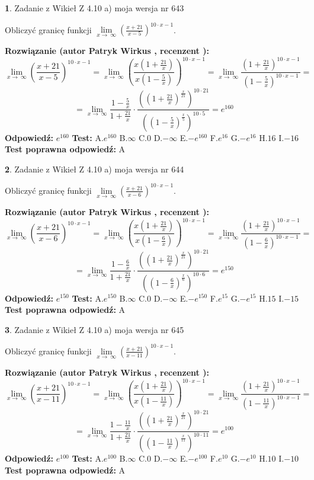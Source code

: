\documentclass[12pt, a4paper]{article}
\theoremstyle{definition} %
\newtheorem{zad}{}
\newcommand{\zadStart}[1]{\begin{zad}#1\newline}
\newcommand{\zadStop}{\end{zad}}
\newcommand{\rozwStart}[2]{\noindent \textbf{Rozwiązanie (autor #1 , recenzent #2): }\newline}
\newcommand{\rozwStop}{\newline}
\newcommand{\odpStart}{\noindent \textbf{Odpowiedź:}\newline}
\newcommand{\odpStop}{\newline}
\newcommand{\testStart}{\noindent \textbf{Test:}\newline}
\newcommand{\testStop}{\newline}
\newcommand{\kluczStart}{\noindent \textbf{Test poprawna odpowiedź:}\newline}
\newcommand{\kluczStop}{\newline}
\begin{document}
\zadStart{Zadanie z Wikieł Z 4.10 a) moja wersja nr 643}

Obliczyć granicę funkcji  $\lim\limits_{x\to\ \infty}(\frac{x+21}{x-5})^{10\cdot x-1}$.
\zadStop
\rozwStart{Patryk Wirkus}{}
$$\lim\limits_{x\to\ \infty}(\frac{x+21}{x-5})^{10\cdot x-1} = \lim\limits_{x\to\ \infty}(\frac{x(1+\frac{21}{x})}{x(1-\frac{5}{x})})^{10\cdot x-1}=\lim\limits_{x\to\ \infty}\frac{(1+\frac{21}{x})^{10\cdot x-1}}{(1-\frac{5}{x})^{10\cdot x-1}}=$$
$$=\lim\limits_{x\to\ \infty}\frac{1-\frac{5}{x}}{1+\frac{21}{x}}\cdot\frac{((1+\frac{21}{x})^{\frac{x}{21}})^{10\cdot21}}{((1-\frac{5}{x})^{\frac{x}{5}})^{10\cdot5}}=e^{160}$$
\rozwStop
\odpStart
$e^{160}$
\odpStop
\testStart
A.$e^{160}$ B.$\infty$ C.$0$ D.$-\infty$ E.$-e^{160}$
F.$e^{16}$ G.$-e^{16}$
H.$16$
I.$-16$
\testStop
\kluczStart
A
\kluczStop



\zadStart{Zadanie z Wikieł Z 4.10 a) moja wersja nr 644}

Obliczyć granicę funkcji  $\lim\limits_{x\to\ \infty}(\frac{x+21}{x-6})^{10\cdot x-1}$.
\zadStop
\rozwStart{Patryk Wirkus}{}
$$\lim\limits_{x\to\ \infty}(\frac{x+21}{x-6})^{10\cdot x-1} = \lim\limits_{x\to\ \infty}(\frac{x(1+\frac{21}{x})}{x(1-\frac{6}{x})})^{10\cdot x-1}=\lim\limits_{x\to\ \infty}\frac{(1+\frac{21}{x})^{10\cdot x-1}}{(1-\frac{6}{x})^{10\cdot x-1}}=$$
$$=\lim\limits_{x\to\ \infty}\frac{1-\frac{6}{x}}{1+\frac{21}{x}}\cdot\frac{((1+\frac{21}{x})^{\frac{x}{21}})^{10\cdot21}}{((1-\frac{6}{x})^{\frac{x}{6}})^{10\cdot6}}=e^{150}$$
\rozwStop
\odpStart
$e^{150}$
\odpStop
\testStart
A.$e^{150}$ B.$\infty$ C.$0$ D.$-\infty$ E.$-e^{150}$
F.$e^{15}$ G.$-e^{15}$
H.$15$
I.$-15$
\testStop
\kluczStart
A
\kluczStop



\zadStart{Zadanie z Wikieł Z 4.10 a) moja wersja nr 645}

Obliczyć granicę funkcji  $\lim\limits_{x\to\ \infty}(\frac{x+21}{x-11})^{10\cdot x-1}$.
\zadStop
\rozwStart{Patryk Wirkus}{}
$$\lim\limits_{x\to\ \infty}(\frac{x+21}{x-11})^{10\cdot x-1} = \lim\limits_{x\to\ \infty}(\frac{x(1+\frac{21}{x})}{x(1-\frac{11}{x})})^{10\cdot x-1}=\lim\limits_{x\to\ \infty}\frac{(1+\frac{21}{x})^{10\cdot x-1}}{(1-\frac{11}{x})^{10\cdot x-1}}=$$
$$=\lim\limits_{x\to\ \infty}\frac{1-\frac{11}{x}}{1+\frac{21}{x}}\cdot\frac{((1+\frac{21}{x})^{\frac{x}{21}})^{10\cdot21}}{((1-\frac{11}{x})^{\frac{x}{11}})^{10\cdot11}}=e^{100}$$
\rozwStop
\odpStart
$e^{100}$
\odpStop
\testStart
A.$e^{100}$ B.$\infty$ C.$0$ D.$-\infty$ E.$-e^{100}$
F.$e^{10}$ G.$-e^{10}$
H.$10$
I.$-10$
\testStop
\kluczStart
A
\kluczStop
\end{document}

